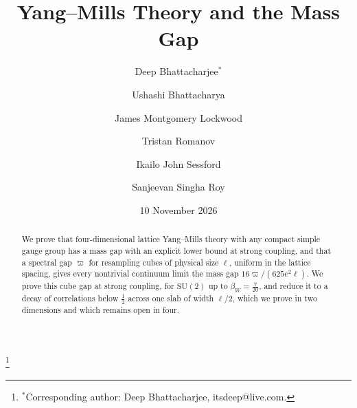 \documentclass[11pt]{amsart}
\theoremstyle{definition}
\theoremstyle{remark}
\numberwithin{equation}{section}
\newcommand{\SU}{\mathrm{SU}}
\begin{document}

\title{Yang--Mills Theory and the Mass Gap}

\author[D. Bhattacharjee]{Deep Bhattacharjee$^{*}$}
\address{Formerly, Electro-Gravitational Space Propulsion Laboratory
(EGSPL), Bhubaneswar, Odisha 751030, India; formerly, University of Calcutta (Heramba Chandra College), 23/49 Gariahat
Road, Golpark, Kolkata 700029, West Bengal, India}
\thanks{$^{*}$Corresponding author: Deep Bhattacharjee, itsdeep@live.com.}

\author[U. Bhattacharya]{Ushashi Bhattacharya}
\address{Formerly, National Taiwan University, Taipei 106319, Taiwan}

\author[J. M. Lockwood]{James Montgomery Lockwood}
\address{Independent Researcher, San Antonio, USA}

\author[T. Romanov]{Tristan Romanov}
\address{Independent Researcher, San Francisco, CA, USA}

\author[I. J. Sessford]{Ikailo John Sessford}
\address{Ikailo Inc., Whitby, Ontario, Canada}

\author[S. Singha Roy]{Sanjeevan Singha Roy}
\address{Department of Physics, Birla Institute of Technology, Mesra, Ranchi,
Jharkhand 835215, India}

\date{10 November 2026}


\begin{abstract}
We prove that four-dimensional lattice Yang--Mills theory with any compact
simple gauge group has a mass gap with an explicit lower bound at strong
coupling, and that a spectral gap $\varpi$ for resampling cubes of physical
size $\ell$, uniform in the lattice spacing, gives every nontrivial continuum
limit the mass gap $16\varpi/(625e^2\ell)$. We prove this cube gap at strong
coupling, for $\SU(2)$ up to $\beta_W=\frac7{20}$, and reduce it to a decay of
correlations below $\frac12$ across one slab of width $\ell/2$, which we prove
in two dimensions and which remains open in four.
\end{abstract}
\end{document}
